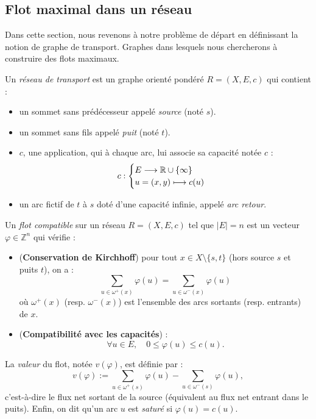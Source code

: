 \subsection{Flot maximal dans un réseau}

Dans cette section, nous revenons à notre problème de départ en définissant la notion de graphe de transport. 
Graphes dans lesquels nous chercherons à construire des flots maximaux. 

\begin{definition}
    Un \emph{réseau de transport} est un graphe orienté pondéré $ R = (X, E, c)$ qui contient : 
    \begin{itemize} 
        \item un sommet {sans prédécesseur} appelé \emph{source} (noté $s$). 
        \item  un sommet {sans fils} appelé \emph{puit} (noté $t$). 
        \item $ c$, une application, qui à chaque arc, lui associe sa capacité notée $c$ : 
            \[ 
                c : 
                    \begin{cases}
                        E \longrightarrow \mathbb{R} \cup \{\infty\} \\
                        u = (x,y) \longmapsto c(u) 
                    \end{cases}
            \] 
        \item un arc fictif de $t$ à $s$ doté d'une capacité infinie, appelé \emph{arc retour}. 
    \end{itemize}
\end{definition}

\begin{definition}
    Un \emph{flot compatible} sur un réseau $ R = (X,E, c)$ tel que $ |E| = n$ 
    est un vecteur $ \varphi \in \mathbb{Z}^n$ qui vérifie :
    \begin{itemize}
        \item (\textbf{Conservation de Kirchhoff}) pour tout $x \in X \setminus \{s, t\}$ 
        (hors source $s$ et puits $t$), on a :
        $$ \sum_{u \in \omega^+(x)} \varphi(u) = \sum_{u \in \omega^-(x)} \varphi(u) $$
        où $\omega^+(x)$ (resp. $\omega^-(x)$) est l'ensemble des arcs sortants (resp. entrants) de $x$.
        \item (\textbf{Compatibilité avec les capacités}) :
        $$ \forall u \in E, \quad 0 \leqslant \varphi(u) \leqslant c(u). $$
    \end{itemize}
    La \emph{valeur} du flot, notée $v(\varphi)$, est définie par :
    $$ v(\varphi) := \sum_{u \in \omega^+(s)} \varphi(u) - \sum_{u \in \omega^-(s)} \varphi(u), $$
    c'est-à-dire le flux net sortant de la source (équivalent au flux net entrant dans le puits).
    Enfin, on dit qu'un arc $u$ est \emph{saturé} si $\varphi(u)=c(u)$.
\end{definition}

